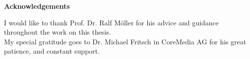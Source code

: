 \bigskip
\bigskip

\pagebreak\par
{\Large\noindent \textbf{Acknowledgements}}\\

\bigskip
\bigskip


I would like to thank Prof. Dr. Ralf M\"oller for his advice and guidance throughout the work on this thesis. \\
My special gratitude goes to Dr. Michael Fritsch in CoreMedia AG for his great patience, and constant support. \\


\pagebreak
